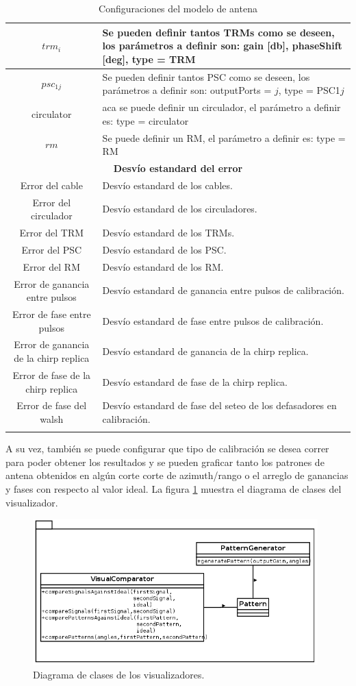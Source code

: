 \begin{center}
\begin{longtable}{|c|p{9cm}|}
	$trm_i$ & Se pueden definir tantos TRMs como se deseen, los parámetros a definir son: gain [db], phaseShift [deg], type = TRM \tabularnewline \hline 
	$psc_{1j}$ & Se pueden definir tantos PSC como se deseen, los parámetros a definir son: outputPorts = $j$, type = PSC1$j$ \tabularnewline \hline 
	circulator & aca se puede definir un circulador, el parámetro a definir es: type = circulator \tabularnewline \hline 
	$rm$ & Se puede definir un RM, el parámetro a definir es: type = RM \tabularnewline \hline 
	\multicolumn{2}{|c|}{\textbf{Desvío estandard del error}} \\
	\hline
	Error del cable & Desvío estandard de los cables. \tabularnewline \hline 
	Error del circulador & Desvío estandard de los circuladores. \tabularnewline \hline 
	Error del TRM & Desvío estandard de los TRMs. \tabularnewline \hline 
	Error del PSC & Desvío estandard de los PSC. \tabularnewline \hline 
	Error del RM & Desvío estandard de los RM. \tabularnewline \hline 
	Error de ganancia entre pulsos & Desvío estandard de ganancia entre pulsos de calibración. \tabularnewline \hline 
	Error de fase entre pulsos & Desvío estandard de fase entre pulsos de calibración. \tabularnewline \hline 
	Error de ganancia de la chirp replica & Desvío estandard de ganancia de la chirp replica. \tabularnewline \hline 
	Error de fase de la chirp replica & Desvío estandard de fase de la chirp replica. \tabularnewline \hline 
	Error de fase del walsh & Desvío estandard de fase del seteo de los defasadores en calibración. \tabularnewline \hline 
	\caption{Configuraciones del modelo de antena}
  \end{longtable}
  \label{tab:conf_modelo_antena}
\end{center}

A su vez, también se puede configurar que tipo de calibración se desea correr para poder obtener los resultados y se pueden 
graficar tanto los patrones de antena obtenidos en algún corte corte de azimuth/rango o el arreglo de ganancias y fases con 
respecto al valor ideal. La figura \ref{fig:visualPackage} muestra el diagrama de clases del visualizador.

\begin{figure}
 \centering
 \includegraphics[width=11cm]{gfx/visualPackage.png}
 \caption{Diagrama de clases de los visualizadores.}
 \label{fig:visualPackage}
\end{figure}

